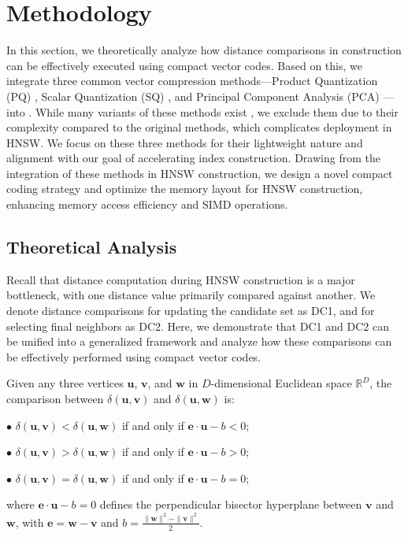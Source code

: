 \section{Methodology}
\label{sec: data processing}
In this section, we theoretically analyze how distance comparisons in  construction can be effectively executed using compact vector codes. Based on this, we integrate three common vector compression methods—Product Quantization (PQ) \cite{PQ}, Scalar Quantization (SQ) \cite{LVQ}, and Principal Component Analysis (PCA) \cite{PCA}—into . While many variants of these methods exist \cite{OPQ, RaBitQ, WangLKC16, Distill-VQ, ZhangDW14, HeNB21, ScaNN, DeltaPQ}, we exclude them due to their complexity compared to the original methods, which complicates deployment in HNSW. We focus on these three methods for their lightweight nature and alignment with our goal of accelerating index construction. Drawing from the integration of these methods in HNSW construction, we design a novel compact coding strategy and optimize the memory layout for HNSW construction, enhancing memory access efficiency and SIMD operations.

\subsection{Theoretical Analysis}
Recall that distance computation during HNSW construction is a major bottleneck, with one distance value primarily compared against another. We denote distance comparisons for updating the candidate set as DC1, and for selecting final neighbors as DC2. Here, we demonstrate that DC1 and DC2 can be unified into a generalized framework and analyze how these comparisons can be effectively performed using compact vector codes.

\begin{myLemma}
\label{lemma: dist comp}
Given any three vertices $\boldsymbol{u}$, $\boldsymbol{v}$, and $\boldsymbol{w}$ in $D$-dimensional Euclidean space $\mathbb{R}^D$, the comparison between $\delta(\boldsymbol{u}, \boldsymbol{v})$ and $\delta(\boldsymbol{u}, \boldsymbol{w})$ is:

\noindent $\bullet$ $\delta(\boldsymbol{u}, \boldsymbol{v}) < \delta(\boldsymbol{u}, \boldsymbol{w})$ if and only if $\boldsymbol{e} \cdot \boldsymbol{u} - b < 0$;

\noindent $\bullet$ $\delta(\boldsymbol{u}, \boldsymbol{v}) > \delta(\boldsymbol{u}, \boldsymbol{w})$ if and only if $\boldsymbol{e} \cdot \boldsymbol{u} - b > 0$;

\noindent $\bullet$ $\delta(\boldsymbol{u}, \boldsymbol{v}) = \delta(\boldsymbol{u}, \boldsymbol{w})$ if and only if $\boldsymbol{e} \cdot \boldsymbol{u} - b = 0$;

\noindent where $\boldsymbol{e} \cdot \boldsymbol{u} - b = 0$ defines the perpendicular bisector hyperplane between $\boldsymbol{v}$ and $\boldsymbol{w}$, with $\boldsymbol{e}=\boldsymbol{w} - \boldsymbol{v}$ and $b = \frac{\|\boldsymbol{w}\|^2 - \|\boldsymbol{v}\|^2}{2}$.
\end{myLemma}

